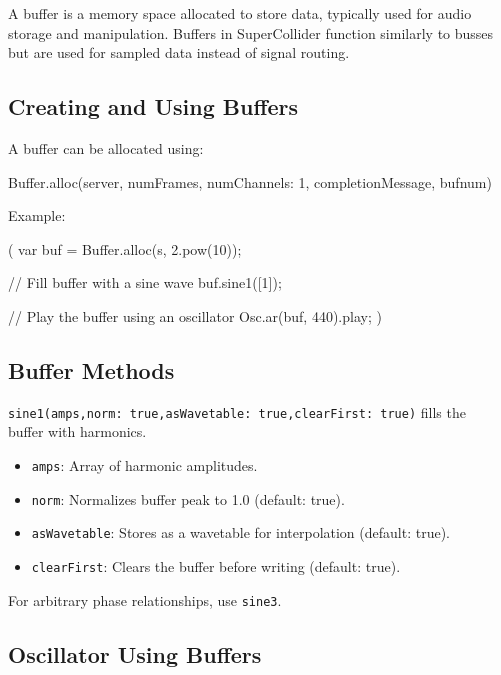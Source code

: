 A buffer is a memory space allocated to store data, typically used for audio storage and manipulation. Buffers in SuperCollider function similarly to busses but are used for sampled data instead of signal routing.

\subsection{Creating and Using Buffers}

A buffer can be allocated using:

\begin{supercollider*}
Buffer.alloc(server, numFrames, numChannels: 1, completionMessage, bufnum)
\end{supercollider*}

Example:

\begin{supercollider*}
(
var buf = Buffer.alloc(s, 2.pow(10));

// Fill buffer with a sine wave
buf.sine1([1]);

// Play the buffer using an oscillator
{Osc.ar(buf, 440)}.play;
)
\end{supercollider*}

\subsection{Buffer Methods}

\texttt{sine1(amps,norm: true,asWavetable: true,clearFirst: true)} fills the\hfill\\buffer with harmonics.

\begin{itemize}
    \item \texttt{amps}: Array of harmonic amplitudes.
    \item \texttt{norm}: Normalizes buffer peak to 1.0 (default: true).
    \item \texttt{asWavetable}: Stores as a wavetable for interpolation (default: true).
    \item \texttt{clearFirst}: Clears the buffer before writing (default: true).
\end{itemize}

For arbitrary phase relationships, use \texttt{sine3}.

\subsection{Oscillator Using Buffers}

